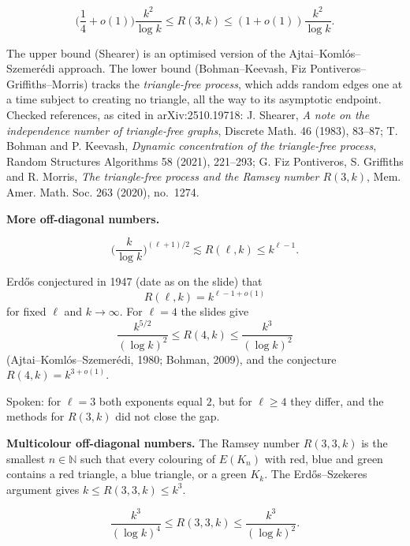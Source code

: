 \begin{theorem}
\label{theorem-r3k-quarter}
$$
\Big(\frac{1}{4} + o(1)\Big)
\frac{k^2}{\log k}
\le R(3,k) \le
(1 + o(1))\frac{k^2}{\log k}.
$$
\end{theorem}

\noindent
The upper bound (Shearer) is an optimised
version of the Ajtai--Koml\'os--Szemer\'edi
approach. The lower bound (Bohman--Keevash,
Fiz Pontiveros--Griffiths--Morris) tracks
the \emph{triangle-free process}, which adds
random edges one at a time subject to
creating no triangle, all the way to its
asymptotic endpoint. Checked references, as
cited in arXiv:2510.19718: J. Shearer,
\emph{A note on the independence number of
triangle-free graphs}, Discrete Math. 46
(1983), 83--87; T. Bohman and P. Keevash,
\emph{Dynamic concentration of the
triangle-free process}, Random Structures
Algorithms 58 (2021), 221--293; G. Fiz
Pontiveros, S. Griffiths and R. Morris,
\emph{The triangle-free process and the
Ramsey number $R(3,k)$}, Mem. Amer. Math.
Soc. 263 (2020), no.~1274.

\medskip\noindent
{\bf More off-diagonal numbers.}
\begin{theorem}
\label{theorem-spencer}
$$
\Big(\frac{k}{\log k}\Big)^{(\ell+1)/2}
\lesssim R(\ell,k) \le k^{\ell-1}.
$$
\end{theorem}

\noindent
Erd\H{o}s conjectured in 1947 (date as on the
slide) that
$$
R(\ell,k) = k^{\ell - 1 + o(1)}
$$
for fixed $\ell$ and $k \to \infty$. For
$\ell = 4$ the slides give
$$
\frac{k^{5/2}}{(\log k)^2}
\le R(4,k) \le
\frac{k^3}{(\log k)^2}
$$
(Ajtai--Koml\'os--Szemer\'edi, 1980; Bohman,
2009), and the conjecture
$R(4,k) = k^{3+o(1)}$.

\noindent
Spoken: for $\ell = 3$ both exponents equal
$2$, but for $\ell \ge 4$ they differ, and
the methods for $R(3,k)$ did not close the
gap.

\medskip\noindent
{\bf Multicolour off-diagonal numbers.} The
Ramsey number $R(3,3,k)$ is the smallest
$n \in \mathbb{N}$ such that every colouring
of $E(K_n)$ with red, blue and green contains
a red triangle, a blue triangle, or a green
$K_k$. The Erd\H{o}s--Szekeres argument gives
$k \le R(3,3,k) \le k^3$.

\begin{theorem}
\label{theorem-alon-rodl}
$$
\frac{k^3}{(\log k)^4}
\le R(3,3,k) \le
\frac{k^3}{(\log k)^2}.
$$
\end{theorem}

